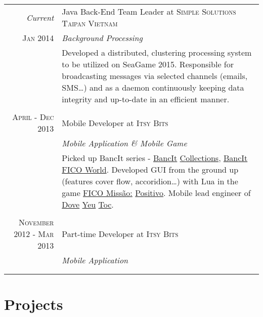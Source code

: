 \documentclass[a4paper,10pt]{article}
\begin{document}
\begin{tabular}{r|p{11cm}}

    \emph{Current} & Java Back-End Team Leader at \textsc{Simple Solutions Taipan Vietnam} \\\textsc{Jan 2014}&\emph{Background Processing}\\&\footnotesize{Developed a distributed, clustering processing system to be utilized on SeaGame 2015. Responsible for broadcasting messages via selected channels (emails, SMS\ldots) and as a daemon continuously keeping data integrity and up-to-date in an efficient manner.}\\ \\

    \textsc{April - Dec 2013 } & Mobile Developer at \textsc{Itsy Bits} \\&\emph{Mobile Application \& Mobile Game}\\&\footnotesize{Picked up BancIt series - \href{https://itunes.apple.com/au/app/bancit-collections/id618952101?mt=8}{BancIt} \href{https://play.google.com/store/apps/details?id=com.bankerslab.collections}{Collections}, \href{https://itunes.apple.com/us/app/bancit-fico-world/id631150220?mt=8}{BancIt} \href{https://play.google.com/store/apps/details?id=com.bankerslab.bancitfico&hl=en}{FICO World}.
    Developed GUI from the ground up (features cover flow, accoridion\ldots) with Lua in the game \href{https://itunes.apple.com/us/app/fico-missao-positivo/id688665142?mt=8}{FICO Missão:} \href{https://play.google.com/store/apps/details?id=com.bankerslab.missaopositivo}{Positivo}.
    Mobile lead engineer of \href{http://www.toilacogaidove.com.vn/phuc-hoi-hu-ton-moi/dove-yeu-toc}{Dove} \href{https://itunes.apple.com/vn/app/dove-yeu-toc/id733163838?mt=8}{Yeu} \href{https://play.google.com/store/apps/details?id=net.itsybits.dovediamante&hl=en}{Toc}.
}\\ \\

\textsc{November 2012 - Mar 2013} & Part-time Developer at \textsc{Itsy Bits} \\&\emph{Mobile Application}\\&\footnotesize{
}\\ \\

\end{tabular}

\section{Projects}
\end{document}
